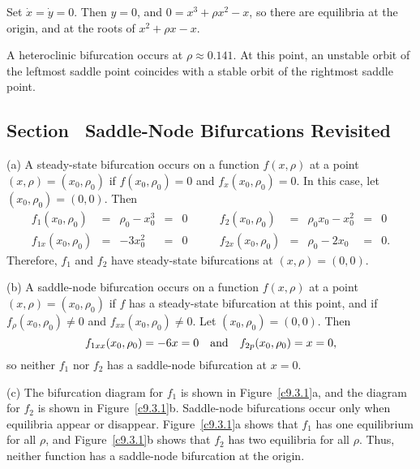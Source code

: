\documentclass{ximera}
\begin{document}
\soln Set $\dot{x} = \dot{y} = 0$.  Then $y = 0$, and
$0 = x^3 + \rho x^2 - x$, so there are equilibria at the origin, and at
the roots of $x^2 + \rho x - x$.

A heteroclinic bifurcation occurs at $\rho \approx 0.141$.  At this
point, an unstable orbit of the leftmost saddle point coincides with a
stable orbit of the rightmost saddle point.



\subsection*{Section~\protect{\ref{S:SNB}} Saddle-Node Bifurcations Revisited}

(a) A steady-state bifurcation occurs on a function $f(x,\rho)$ at a
point $(x,\rho) = (x_0,\rho_0)$ if $f(x_0,\rho_0) = 0$ and
$f_x(x_0,\rho_0) = 0$.  In this case, let $(x_0,\rho_0) = (0,0)$.
Then
\[ \begin{array}{rcccl}
f_1(x_0,\rho_0) & = & \rho_0 - x_0^3 & = & 0 \\
f_{1x}(x_0,\rho_0) & = & -3x_0^2 & = & 0 \end{array}
\qquad
\begin{array}{rcccl}
f_2(x_0,\rho_0) & = & \rho_0x_0 - x_0^2 & = & 0 \\
f_{2x}(x_0,\rho_0) & = & \rho_0 - 2x_0 & = & 0. \end{array}
\]
Therefore, $f_1$ and $f_2$ have steady-state bifurcations at $(x,\rho)
= (0,0)$.

(b) A saddle-node bifurcation occurs on a function $f(x,\rho)$ at a point
$(x,\rho) = (x_0,\rho_0)$ if $f$ has a steady-state bifurcation at this
point, and if $f_\rho(x_0,\rho_0) \neq 0$ and $f_{xx}(x_0,\rho_0) \neq 0$.
Let $(x_0,\rho_0) = (0,0)$.  Then
\[
f_{1xx}(x_0,\rho_0) = -6x = 0 \quad\mbox{and}\quad
f_{2p}(x_0,\rho_0) = x = 0,
\]
so neither $f_1$ nor $f_2$ has a saddle-node bifurcation at $x = 0$.

(c) The bifurcation diagram for $f_1$ is shown in Figure~\ref{c9.3.1}a, and
the diagram for $f_2$ is shown in Figure~\ref{c9.3.1}b.  Saddle-node
bifurcations occur only when equilibria appear or disappear.
Figure~\ref{c9.3.1}a shows that $f_1$ has one equilibrium for all $\rho$,
and Figure~\ref{c9.3.1}b shows that $f_2$ has two equilibria for all
$\rho$.  Thus, neither function has a saddle-node bifurcation at the origin.

\begin{figure}[htb]
                       \centerline{%
                       }
\end{figure}
\end{document}

